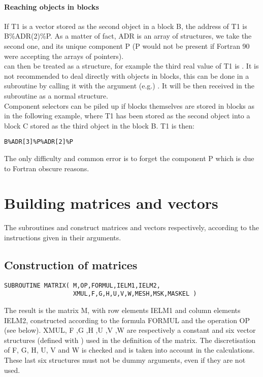 \paragraph{Reaching objects in blocks}

If T1 is a vector stored as the second object in a block B, the address of T1
is B\%ADR(2)\%P. As a matter of fact, ADR is an array of
 structures, we take the second one, and its unique
component P (P would not be present if Fortran 90 were accepting the arrays of
pointers).
\\
 can then be treated as a  structure,
  for example the third real value of T1 is . It is
    not recommended to deal directly with objects in blocks, this can be done
    in a subroutine by calling it with the argument (e.g.)
    . It will be then received in the subroutine as a
      normal  structure.
\\
Component selectors can be piled up if blocks themselves are stored in blocks
as in the following example, where T1 has been stored as the second object into
a block C stored as the third object in the block B. T1 is then:

\begin{lstlisting}[language=TelFortran]
B%ADR[3]%P%ADR[2]%P
\end{lstlisting}
The only difficulty and common error is to forget the component P which is due
to Fortran obscure reasons.

\section{Building matrices and vectors}
\label{ref:matvec}

The subroutines  and  construct matrices and
vectors respectively, according to the instructions given in their arguments.

\subsection{Construction of matrices}

\begin{lstlisting}[language=TelFortran]
SUBROUTINE MATRIX( M,OP,FORMUL,IELM1,IELM2,
                   XMUL,F,G,H,U,V,W,MESH,MSK,MASKEL )
\end{lstlisting}
The result is the matrix M, with row elements IELM1 and column elements IELM2,
constructed according to the formula FORMUL and the operation OP (see below).
XMUL, F ,G ,H ,U ,V ,W are respectively a constant and six vector structures
(defined with ) used in the definition of the matrix. The
discretisation of F, G, H, U, V and W is checked and is taken into account in
the calculations. These last six structures must not be dummy arguments, even
if they are not used.

